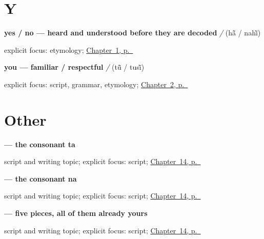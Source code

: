 \section*{Y}

\noindent\begin{minipage}[t]{\linewidth}
\raggedright
\textbf{yes / no — heard and understood before they are decoded}\enspace\emph{ / }\enspace(hā̃ / nahī̃)\par
\footnotesize explicit focus: etymology; \hyperref[ch:greetings]{Chapter~1, p.~\pageref*{ch:greetings}}
\end{minipage}\par\smallskip

\noindent\begin{minipage}[t]{\linewidth}
\raggedright
\textbf{you — familiar / respectful}\enspace\emph{ / }\enspace(tū̃ / tusī̃)\par
\footnotesize explicit focus: script, grammar, etymology; \hyperref[ch:introductions]{Chapter~2, p.~\pageref*{ch:introductions}}
\end{minipage}\par\smallskip

\section*{Other}

\noindent\begin{minipage}[t]{\linewidth}
\raggedright
\textbf{ — the consonant ta}\par
\footnotesize script and writing topic; explicit focus: script; \hyperref[ch:pa-script-first]{Chapter~14, p.~\pageref*{ch:pa-script-first}}
\end{minipage}\par\smallskip

\noindent\begin{minipage}[t]{\linewidth}
\raggedright
\textbf{ — the consonant na}\par
\footnotesize script and writing topic; explicit focus: script; \hyperref[ch:pa-script-first]{Chapter~14, p.~\pageref*{ch:pa-script-first}}
\end{minipage}\par\smallskip

\noindent\begin{minipage}[t]{\linewidth}
\raggedright
\textbf{ — five pieces, all of them already yours}\par
\footnotesize script and writing topic; explicit focus: script; \hyperref[ch:pa-script-first]{Chapter~14, p.~\pageref*{ch:pa-script-first}}
\end{minipage}\par\smallskip

